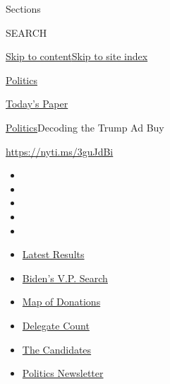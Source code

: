 Sections

SEARCH

\protect\hyperlink{site-content}{Skip to
content}\protect\hyperlink{site-index}{Skip to site index}

\href{https://www.nytimes3xbfgragh.onion/section/politics}{Politics}

\href{https://myaccount.nytimes3xbfgragh.onion/auth/login?response_type=cookie\&client_id=vi}{}

\href{https://www.nytimes3xbfgragh.onion/section/todayspaper}{Today's
Paper}

\href{/section/politics}{Politics}\textbar{}Decoding the Trump Ad Buy

\url{https://nyti.ms/3guJdBi}

\begin{itemize}
\item
\item
\item
\item
\item
\end{itemize}

\begin{itemize}
\item
  \href{https://www.nytimes3xbfgragh.onion/interactive/2020/08/04/us/elections/results-arizona-kansas-michigan-missouri-primaries.html?action=click\&pgtype=Article\&state=default\&region=TOP_BANNER\&context=storylines_menu}{Latest
  Results}
\item
  \href{https://www.nytimes3xbfgragh.onion/article/biden-vice-president-2020.html?action=click\&pgtype=Article\&state=default\&region=TOP_BANNER\&context=storylines_menu}{Biden's
  V.P. Search}
\item
  \href{https://www.nytimes3xbfgragh.onion/interactive/2020/07/24/us/politics/trump-biden-campaign-donors.html?action=click\&pgtype=Article\&state=default\&region=TOP_BANNER\&context=storylines_menu}{Map
  of Donations}
\item
  \href{https://www.nytimes3xbfgragh.onion/interactive/2020/us/elections/delegate-count-primary-results.html?action=click\&pgtype=Article\&state=default\&region=TOP_BANNER\&context=storylines_menu}{Delegate
  Count}
\item
  \href{https://www.nytimes3xbfgragh.onion/interactive/2019/us/politics/2020-presidential-candidates.html?action=click\&pgtype=Article\&state=default\&region=TOP_BANNER\&context=storylines_menu}{The
  Candidates}
\item
  \href{https://www.nytimes3xbfgragh.onion/newsletters/politics?action=click\&pgtype=Article\&state=default\&region=TOP_BANNER\&context=storylines_menu}{Politics
  Newsletter}
\end{itemize}


